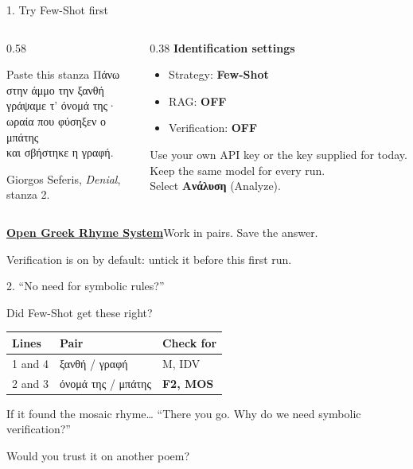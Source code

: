 \documentclass[aspectratio=169,10pt]{beamer}
\newcommand{\key}[1]{\textcolor{aegean}{\textbf{#1}}}
\newcommand{\hl}[1]{\textcolor{terracotta}{\textbf{#1}}}
\newcommand{\stanza}{%
Πάνω στην άμμο την ξανθή\\[4pt]
γράψαμε τ' όνομά της·\\[4pt]
ωραία που φύσηξεν ο μπάτης\\[4pt]
και σβήστηκε η γραφή.}
\newcommand{\demolink}{\href{https://greek-app-heaven-rhyme.livelyhill-85880e66.westeurope.azurecontainerapps.io}{\textbf{Open Greek Rhyme System}}}
\begin{document}
\begin{frame}{1. Try Few-Shot first}
  \begin{columns}[T]
    \begin{column}{0.58\textwidth}
      \begin{block}{Paste this stanza}
        \large\stanza
      \end{block}
      \footnotesize Giorgos Seferis, \emph{Denial}, stanza 2.
    \end{column}
    \begin{column}{0.38\textwidth}
      \textbf{Identification settings}
      \begin{itemize}
        \item Strategy: \key{Few-Shot}
        \item RAG: \hl{OFF}
        \item Verification: \hl{OFF}
      \end{itemize}
      \small Use your own API key or the key supplied for today. Keep the same model for every run.\\[6pt]
      Select \textbf{Ανάλυση} (Analyze).
    \end{column}
  \end{columns}
  \vfill
  \small\demolink\hfill Work in pairs. Save the answer.
  \vspace{3pt}
  \par\footnotesize Verification is on by default: untick it before this first run.
\end{frame}

\begin{frame}{2. ``No need for symbolic rules?''}
  \centering
  {\Large Did Few-Shot get these right?\par}
  \vspace{1em}
  \begin{tabular}{lll}
    \toprule
    \textbf{Lines} & \textbf{Pair} & \textbf{Check for} \\
    \midrule
    1 and 4 & ξανθή / γραφή & M, IDV \\[7pt]
    2 and 3 & όνομά της / μπάτης & \key{F2, MOS} \\
    \bottomrule
  \end{tabular}
  \vspace{1em}
  \begin{block}{If it found the mosaic rhyme\ldots}
    \centering\large ``There you go. Why do we need symbolic verification?''
  \end{block}
  \vspace{0.6em}
  \large Would you trust it on another poem?
\end{frame}
\end{document}
